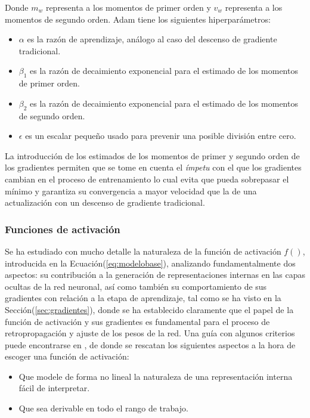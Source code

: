             Donde $m_w$ representa a los momentos de primer orden y $v_w$ representa a los momentos de segundo orden. Adam 
            tiene los siguientes hiperparámetros:

            \begin{itemize}
                \item $\alpha$ es la razón de aprendizaje, análogo al caso del descenso de gradiente tradicional.
                \item $\beta_1$ es la razón de decaimiento exponencial para el estimado de los momentos de primer orden.
                \item $\beta_2$ es la razón de decaimiento exponencial para el estimado de los momentos de segundo orden.
                \item $\epsilon$ es un escalar pequeño usado para prevenir una posible división entre cero.
            \end{itemize}

            La introducción de los estimados de los momentos de primer y segundo orden de los gradientes permiten que 
            se tome en cuenta el \textit{ímpetu} con el que los gradientes cambian en el proceso de entrenamiento lo cual 
            evita que pueda sobrepasar el mínimo y garantiza su convergencia a mayor velocidad que la de una actualización 
            con un descenso de gradiente tradicional.
            

        \subsubsection{Funciones de activación}
        Se ha estudiado con mucho detalle la naturaleza de la función de activación $f()$, introducida en la 
        Ecuación(\ref{eq:modelobase}), analizando fundamentalmente dos aspectos: su contribución a la generación 
        de representaciones internas en las capas ocultas de la red neuronal, así como también su comportamiento 
        de sus gradientes con relación a la etapa de aprendizaje, tal como se ha visto en la Sección(\ref{sec:gradientes}), 
        donde se ha establecido claramente que el papel de la función de activación y sus gradientes es fundamental para 
        el proceso de retropropagación y ajuste de los pesos de la red. Una guía con algunos criterios puede 
        encontrarse en \cite{mhaskar1994choose}, de donde se rescatan los siguientes aspectos a la hora de escoger una 
        función de activación:
        \begin{itemize}
            \item Que modele de forma no lineal la naturaleza de una representación interna fácil de interpretar.
            \item Que sea derivable en todo el rango de trabajo.
        \end{itemize}


